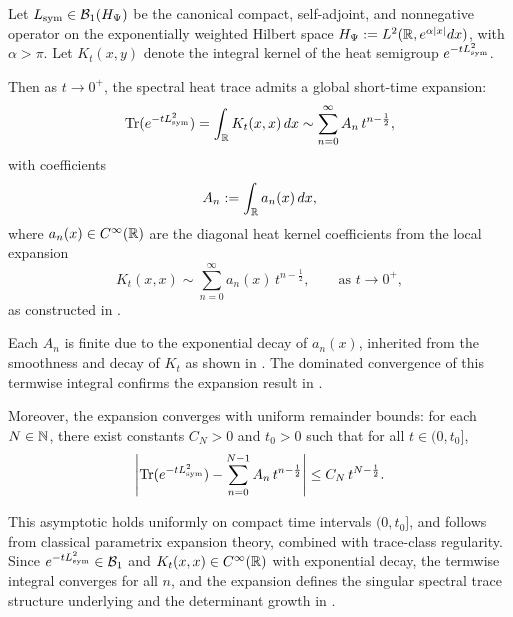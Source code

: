 \begin{proposition}
\label{prop:heat_trace_uniform_conv}
Let \( L_{\mathrm{sym}} \in \mathcal{B}_1(H_{\Psi}) \) be the canonical compact, self-adjoint, and nonnegative operator on the exponentially weighted Hilbert space \( H_{\Psi} := L^2(\mathbb{R}, e^{\alpha|x|} dx) \), with \( \alpha > \pi \). Let \( K_t(x,y) \) denote the integral kernel of the heat semigroup \( e^{-t L_{\mathrm{sym}}^2} \).

Then as \( t \to 0^+ \), the spectral heat trace admits a global short-time expansion:
\[
\operatorname{Tr}(e^{-t L_{\mathrm{sym}}^2}) = \int_{\mathbb{R}} K_t(x,x)\, dx
\sim \sum_{n=0}^\infty A_n\, t^{n - \frac{1}{2}},
\]
with coefficients
\[
A_n := \int_{\mathbb{R}} a_n(x)\, dx,
\]
where \( a_n(x) \in C^\infty(\mathbb{R}) \) are the diagonal heat kernel coefficients from the local expansion
\[
K_t(x,x) \sim \sum_{n=0}^\infty a_n(x)\, t^{n - \frac{1}{2}}, \qquad \text{as } t \to 0^+,
\]
as constructed in .

\medskip
\noindent
Each \( A_n \) is finite due to the exponential decay of \( a_n(x) \), inherited from the smoothness and decay of \( K_t \) as shown in . The dominated convergence of this termwise integral confirms the expansion result in .

\medskip
\noindent
Moreover, the expansion converges with uniform remainder bounds: for each \( N \in \mathbb{N} \), there exist constants \( C_N > 0 \) and \( t_0 > 0 \) such that for all \( t \in (0, t_0] \),
\[
\left| \operatorname{Tr}(e^{-t L_{\mathrm{sym}}^2}) - \sum_{n=0}^{N-1} A_n\, t^{n - \frac{1}{2}} \right| \leq C_N\, t^{N - \frac{1}{2}}.
\]

\medskip
\noindent
This asymptotic holds uniformly on compact time intervals \( (0, t_0] \), and follows from classical parametrix expansion theory, combined with trace-class regularity. Since \( e^{-t L_{\mathrm{sym}}^2} \in \mathcal{B}_1 \) and \( K_t(x,x) \in C^\infty(\mathbb{R}) \) with exponential decay, the termwise integral converges for all \( n \), and the expansion defines the singular spectral trace structure underlying  and the determinant growth in .
\end{proposition}
